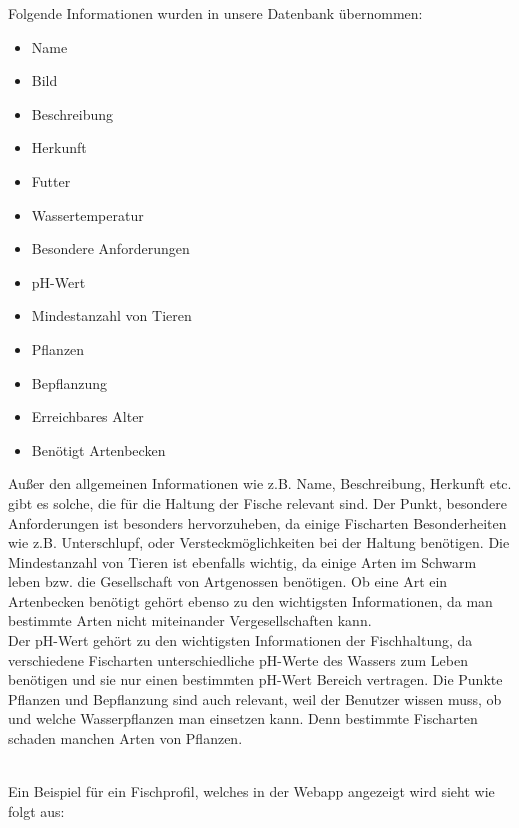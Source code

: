 \newpage

Folgende Informationen wurden in unsere Datenbank übernommen:

\begin{itemize}
    \item Name
    \item Bild
    \item Beschreibung
    \item Herkunft
    \item Futter
    \item Wassertemperatur
    \item Besondere Anforderungen
    \item pH-Wert
    \item Mindestanzahl von Tieren
    \item Pflanzen
    \item Bepflanzung
    \item Erreichbares Alter
    \item Benötigt Artenbecken
\end{itemize}

Außer den allgemeinen Informationen wie z.B. Name, Beschreibung, Herkunft etc. gibt es solche, die für die Haltung der Fische relevant sind. Der Punkt, besondere Anforderungen ist besonders hervorzuheben, da einige Fischarten Besonderheiten wie z.B. Unterschlupf, oder Versteckmöglichkeiten bei der Haltung benötigen. Die Mindestanzahl von Tieren ist ebenfalls wichtig, da einige Arten im Schwarm leben bzw. die Gesellschaft von Artgenossen benötigen. Ob eine Art ein Artenbecken benötigt gehört ebenso zu den wichtigsten Informationen, da man bestimmte Arten nicht miteinander Vergesellschaften kann.\\ Der pH-Wert gehört zu den wichtigsten Informationen der Fischhaltung, da verschiedene Fischarten unterschiedliche pH-Werte des Wassers zum Leben benötigen und sie nur einen bestimmten pH-Wert Bereich vertragen. Die Punkte Pflanzen und Bepflanzung sind auch relevant, weil der Benutzer wissen muss, ob und welche Wasserpflanzen man einsetzen kann. Denn bestimmte Fischarten schaden manchen Arten von Pflanzen.\\ \mbox{} \\

\newpage

Ein Beispiel für ein Fischprofil, welches in der Webapp angezeigt wird sieht wie folgt aus:

